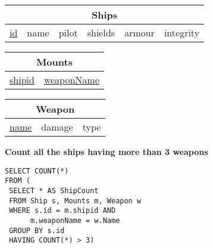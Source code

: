 \documentclass{beamer}
\begin{document}
\begin{frame}[fragile]

\begin{tabular}{|c|c|c|c|c|c|}
\hline
\multicolumn{6}{|c|}{\textbf{Ships}} \\
\hline
\underline{id} & name  & pilot & shields & armour & integrity \\
\hline
\end{tabular}

\begin{tabular}{|c|c|}
\hline
\multicolumn{2}{|c|}{\textbf{Mounts}} \\
\hline
\underline{shipid} & \underline{weaponName} \\
\hline
\end{tabular}

\begin{tabular}{|c|c|c|}
\hline
\multicolumn{3}{|c|}{\textbf{Weapon}} \\
\hline
\underline{name} & damage & type \\
\hline
\end{tabular}

\vspace{0.25cm}
\textbf{Count all the ships having more than 3 weapons}

\pause
\begin{lstlisting}[showstringspaces=false]
SELECT COUNT(*)
FROM (
 SELECT * AS ShipCount
 FROM Ship s, Mounts m, Weapon w
 WHERE s.id = m.shipid AND 
      m.weaponName = w.Name
 GROUP BY s.id
 HAVING COUNT(*) > 3)
                   
\end{lstlisting}

\end{frame}
\end{document}
